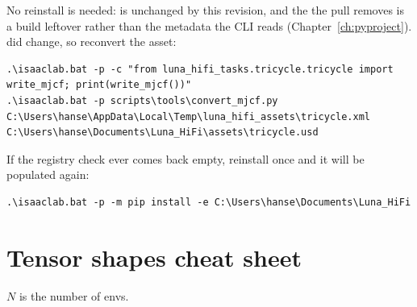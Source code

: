 No reinstall is needed:  is unchanged by this revision,
and the  the pull removes is a build leftover rather than
the metadata the CLI reads (Chapter~\ref{ch:pyproject}). 
did change, so reconvert the asset:
\begin{lstlisting}[style=shell]
.\isaaclab.bat -p -c "from luna_hifi_tasks.tricycle.tricycle import write_mjcf; print(write_mjcf())"
.\isaaclab.bat -p scripts\tools\convert_mjcf.py C:\Users\hanse\AppData\Local\Temp\luna_hifi_assets\tricycle.xml C:\Users\hanse\Documents\Luna_HiFi\assets\tricycle.usd
\end{lstlisting}
If the registry check ever comes back empty, reinstall once and it will be
populated again:
\begin{lstlisting}[style=shell]
.\isaaclab.bat -p -m pip install -e C:\Users\hanse\Documents\Luna_HiFi
\end{lstlisting}

\chapter{Tensor shapes cheat sheet}
\label{app:shapes}

$N$ is the number of envs.


